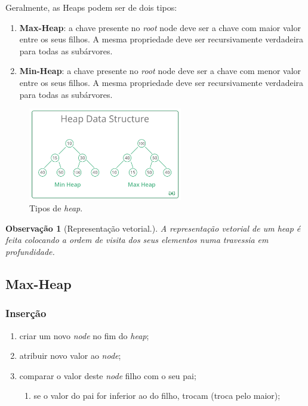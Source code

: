 \documentclass[a4paper, 12pt]{article}
\newtheorem{remark}{Observação}
\begin{document}
Geralmente, as Heaps podem ser de dois tipos:

\begin{enumerate}
    \item \textbf{Max-Heap}: a chave presente no \emph{root} node deve ser a chave com maior valor entre os seus filhos. A mesma propriedade deve ser recursivamente verdadeira para todas as subárvores.
    \item \textbf{Min-Heap}: a chave presente no \emph{root} node deve ser a chave com menor valor entre os seus filhos. A mesma propriedade deve ser recursivamente verdadeira para todas as subárvores.
\end{enumerate}

\begin{figure}[H]
    \centering
    \includegraphics[width=0.6\textwidth]{fig/heaps/MinHeapAndMaxHeap.png}
    \caption{Tipos de \emph{heap}.}
\end{figure}

\begin{remark}[Representação vetorial.]
    A representação vetorial de um \emph{heap} é feita colocando a ordem de visita dos seus elementos numa travessia em profundidade.
\end{remark}

\subsection{Max-Heap}
\subsubsection{Inserção}
\begin{enumerate}
    \item criar um novo \emph{node} no fim do \emph{heap};
    \item atribuir novo valor ao \emph{node};
    \item comparar o valor deste \emph{node} filho com o seu pai;
    \begin{enumerate}
        \item se o valor do pai for inferior ao do filho, trocam (troca pelo maior);
    \end{enumerate}
\end{enumerate}
\end{document}
